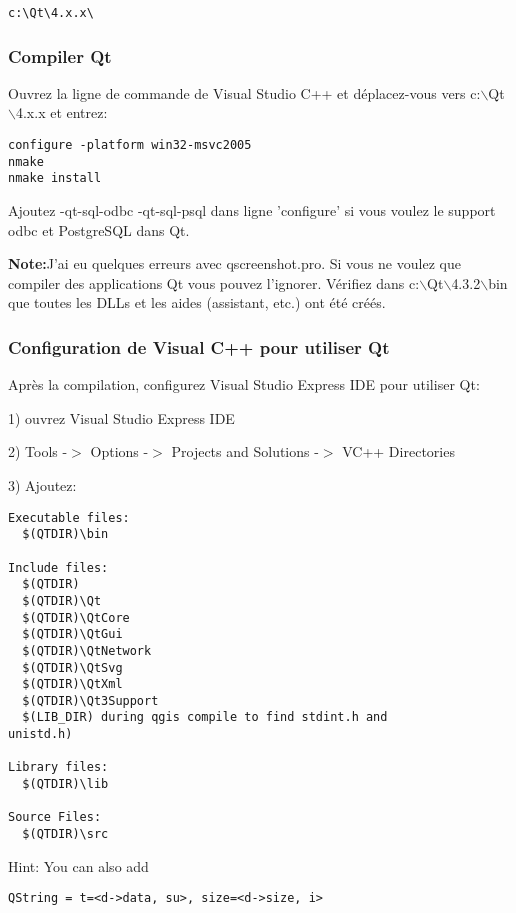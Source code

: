 \begin{verbatim}
c:\Qt\4.x.x\
\end{verbatim}

\subsubsection{Compiler Qt}
Ouvrez la ligne de commande de Visual Studio C++ et déplacez-vous vers c:$\backslash$Qt$\backslash$4.x.x et entrez:

\begin{verbatim}
configure -platform win32-msvc2005
nmake
nmake install
\end{verbatim}

Ajoutez -qt-sql-odbc -qt-sql-psql dans ligne  'configure' si vous voulez le support odbc et PostgreSQL dans Qt.

\textbf{Note:}J'ai eu quelques erreurs avec qscreenshot.pro. Si vous ne voulez que compiler des applications Qt vous pouvez l'ignorer. Vérifiez dans c:$\backslash$Qt$\backslash$4.3.2$\backslash$bin que toutes les DLLs et les aides (assistant, etc.) ont été créés.

\subsubsection{Configuration de Visual C++ pour utiliser Qt}
Après la compilation, configurez Visual Studio Express IDE pour utiliser Qt:

1) ouvrez Visual Studio Express IDE

2) Tools -$>$ Options -$>$ Projects and Solutions -$>$ VC++ Directories

3) Ajoutez:

\begin{verbatim}
Executable files: 
  $(QTDIR)\bin

Include files: 
  $(QTDIR)
  $(QTDIR)\Qt
  $(QTDIR)\QtCore
  $(QTDIR)\QtGui
  $(QTDIR)\QtNetwork
  $(QTDIR)\QtSvg
  $(QTDIR)\QtXml
  $(QTDIR)\Qt3Support
  $(LIB_DIR) during qgis compile to find stdint.h and
unistd.h)

Library files: 
  $(QTDIR)\lib

Source Files:
  $(QTDIR)\src
\end{verbatim}

Hint:  You can also add

\begin{verbatim}
QString = t=<d->data, su>, size=<d->size, i>
\end{verbatim}

